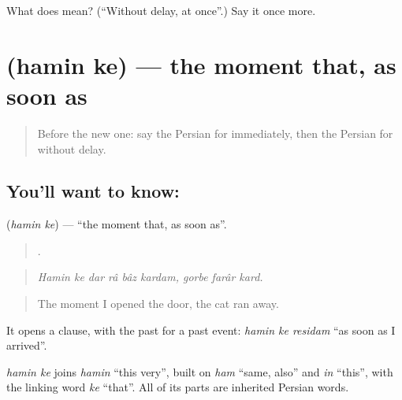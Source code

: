\begin{tcolorbox}[breakable,colback=teal!4,colframe=teal!35!black,title={Before you move on}]
What does   mean? (\textquotedblleft{}Without delay, at once\textquotedblright{}.) Say it once more.
\end{tcolorbox}
\section[\texorpdfstring{\fa{همین} \fa{که} (hamin ke)}{همین که (hamin ke)}]{  (hamin ke) — the moment that, as soon as}

\label{lesson:FA-C300-hamin-ke}



\begin{quote}
Before the new one: say the Persian for immediately, then the Persian for without delay.
\end{quote}

\subsection*{You'll want to know:  }
\textbf{ } (\emph{hamin ke}) — \textquotedblleft{}the moment that, as soon as\textquotedblright{}.

\begin{quote}
        .
\end{quote}

\begin{quote}
\emph{Hamin ke dar râ bâz kardam, gorbe farâr kard.}
\end{quote}

\begin{quote}
The moment I opened the door, the cat ran away.
\end{quote}

It opens a clause, with the past for a past event: \emph{hamin ke residam} \textquotedblleft{}as soon as I arrived\textquotedblright{}.

\begin{cousinweb}
\emph{hamin ke} joins \emph{hamin} \textquotedblleft{}this very\textquotedblright{}, built on \emph{ham} \textquotedblleft{}same, also\textquotedblright{} and \emph{in} \textquotedblleft{}this\textquotedblright{}, with the linking word \emph{ke} \textquotedblleft{}that\textquotedblright{}. All of its parts are inherited Persian words.
\end{cousinweb}

